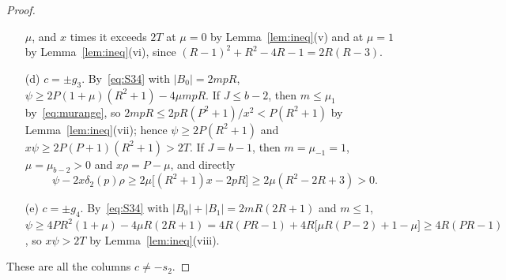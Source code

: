 \documentclass[11pt]{article}
\theoremstyle{remark}
\begin{document}
\begin{proof}
\begin{itemize}
 $\mu$, and $x$ times it exceeds $2T$ at $\mu=0$ by
 Lemma~\ref{lem:ineq}(v) and at $\mu=1$ by Lemma~\ref{lem:ineq}(vi), since
 $(R-1)^2+R^2-4R-1=2R(R-3)$.
\item[(d)] $c=\pm g_3$. By~\eqref{eq:S34} with $|B_0|=2mpR$,
 $\psi\ge2P(1+\mu)(R^2+1)-4\mu mpR$. If $J\le b-2$, then $m\le\mu_1$
 by~\eqref{eq:murange}, so $2mpR\le2pR(P^2+1)/x^2<P(R^2+1)$ by
 Lemma~\ref{lem:ineq}(vii); hence $\psi\ge2P(R^2+1)$ and
 $x\psi\ge2P(P+1)(R^2+1)>2T$. If $J=b-1$, then $m=\mu_{-1}=1$,
 $\mu=\mu_{b-2}>0$ and $x\rho=P-\mu$, and directly
 \[
 \psi-2x\delta_2(p)\rho\ge2\mu\bigl[(R^2+1)x-2pR\bigr]\ge2\mu(R^2-2R+3)>0.
 \]
\item[(e)] $c=\pm g_4$. By~\eqref{eq:S34} with $|B_0|+|B_1|=2mR(2R+1)$ and
 $m\le1$,
 $\psi\ge4PR^2(1+\mu)-4\mu R(2R+1)=4R(PR-1)+4R\bigl[\mu R(P-2)+1-\mu\bigr]
 \ge4R(PR-1)$, so $x\psi>2T$ by Lemma~\ref{lem:ineq}(viii).
\end{itemize}
These are all the columns $c\ne-s_2$.
\end{proof}
\end{document}
